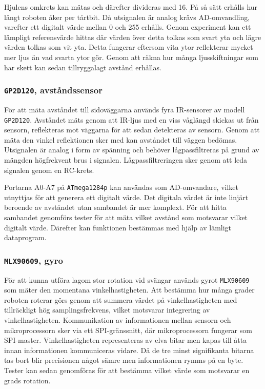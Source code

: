 \documentclass[11pt]{article}
\begin{document}
\begin{flushleft}
Hjulens omkrets kan mätas och därefter divideras med 16. På så sätt erhålls hur långt roboten åker per tårtbit.
Då utsignalen är analog krävs AD-omvandling, varefter ett digitalt värde mellan 0 och 255 erhålls. Genom experiment kan ett lämpligt referensvärde hittas där värden över detta tolkas som svart yta och lägre värden tolkas som vit yta. Detta fungerar eftersom vita ytor reflekterar mycket mer ljus än vad svarta ytor gör. Genom att räkna hur många ljusskiftningar som har skett kan sedan tillryggalagt avstånd erhållas.

\subsubsection{\texttt{GP2D120}, avståndssensor}
För att mäta avståndet till sidoväggarna används fyra IR-sensorer av modell \verb+GP2D120+. Avståndet mäts genom att IR-ljus med en viss våglängd skickas ut från sensorn, reflekteras mot väggarna för att sedan detekteras av sensorn. Genom att mäta den vinkel reflektionen sker med kan avståndet till väggen bedömas. Utsignalen är analog i form av spänning och behöver lågpassfiltreras på grund av mängden högfrekvent brus i signalen. Lågpassfiltreringen sker genom att leda signalen genom en RC-krets. 

Portarna A0-A7 på \verb+ATmega1284p+ kan användas som AD-omvandare, vilket utnyttjas för att generera ett digitalt värde. Det digitala värdet är inte linjärt beroende av avståndet utan sambandet är mer komplext. För att hitta sambandet genomförs tester för att mäta vilket avstånd som motsvarar vilket digitalt värde. Därefter kan funktionen bestämmas med hjälp av lämligt dataprogram.

\subsubsection{\texttt{MLX90609}, gyro}
För att kunna utföra lagom stor rotation vid svängar används gyrot \verb+MLX90609+ som mäter den momentana vinkelhastigheten. Att bestämma hur många grader roboten roterar görs genom att summera värdet på vinkelhastigheten med tillräckligt hög samplingsfrekvens, vilket motsvarar integrering av vinkelhastigheten. Kommunikation av informationen mellan sensorn och mikroprocessorn sker via ett SPI-gränssnitt, där mikroprocessorn fungerar som SPI-master. Vinkelhastigheten representeras av elva bitar men kapas till åtta innan informationen kommuniceras vidare. Då de tre minst signifikanta bitarna tas bort blir precisionen något sämre men informationen rymms på en byte. Tester kan sedan genomföras för att bestämma vilket värde som motsvarar en grads rotation. 


\end{flushleft}
\end{document}
